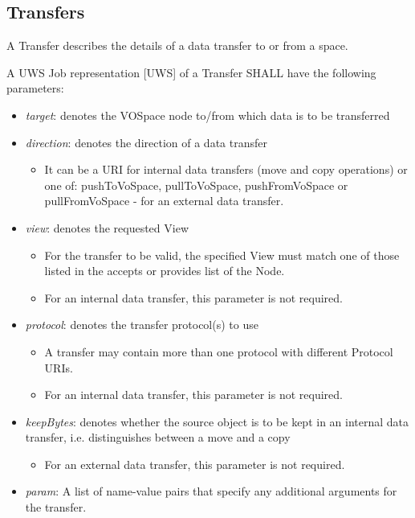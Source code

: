 \documentclass[11pt,a4paper]{ivoa}
\begin{document}
\subsection{Transfers}
\label{subsec:transfers}
A Transfer describes the details of a data transfer to or from a space.

A UWS Job representation [UWS] of a Transfer SHALL have the following parameters:

\begin{itemize}
    \item \emph{target}: denotes the VOSpace node to/from which data is to be transferred
    \item \emph{direction}: denotes the direction of a data transfer
        \begin{itemize}
            \item It can be a URI for internal data transfers (move and copy operations) or one of: pushToVoSpace, pullToVoSpace, pushFromVoSpace or pullFromVoSpace - for an external data transfer.
        \end{itemize}
    \item \emph{view}: denotes the requested View
        \begin{itemize}
            \item For the transfer to be valid, the specified View must match one of those listed in the accepts or provides list of the Node.
            \item For an internal data transfer, this parameter is not required.
        \end{itemize}
    \item \emph{protocol}: denotes the transfer protocol(s) to use
        \begin{itemize}
            \item A transfer may contain more than one protocol with different Protocol URIs.
            \item For an internal data transfer, this parameter is not required.
        \end{itemize}
    \item \emph{keepBytes}: denotes whether the source object is to be kept in an internal data transfer, i.e. distinguishes between a move and a copy
        \begin{itemize}
            \item For an external data transfer, this parameter is not required.
        \end{itemize}
    \item \emph{param}: A list of name-value pairs that specify any additional arguments for the transfer.
\end{itemize}
\end{document}
